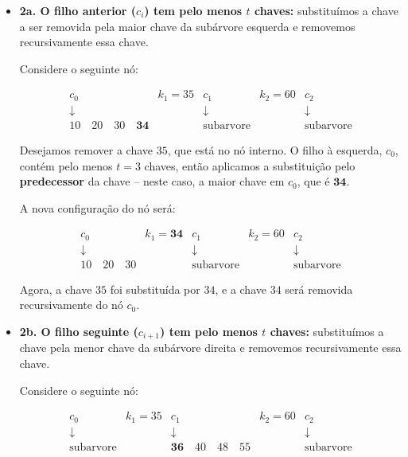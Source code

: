 \begin{itemize}
  \item \textbf{2a. O filho anterior (\( c_i \)) tem pelo menos \( t \) chaves:} substituímos a chave a ser removida pela maior chave da subárvore esquerda e removemos recursivamente essa chave.

Considere o seguinte nó:

\[
\begin{array}{ccccccc}
  \boxed{c_0}      &  k_1 = 35 & \boxed{c_1}       & k_2 = 60 & \boxed{c_2} \\
  \downarrow       &           & \downarrow        &          & \downarrow  \\
  \boxed{10 \quad 20 \quad 30 \quad \textbf{34}} &  & \text{subarvore} &  & \text{subarvore}
\end{array}
\]

Desejamos remover a chave \( 35 \), que está no nó interno. 
O filho à esquerda, \( c_0 \), contém pelo menos \( t = 3 \) chaves, então aplicamos a substituição pelo \textbf{predecessor} da chave -- neste caso, a maior chave em \( c_0 \), que é \( \mathbf{34} \).

A nova configuração do nó será:

\[
\begin{array}{ccccccc}
  \boxed{c_0}      &  k_1 = \mathbf{34} & \boxed{c_1}       & k_2 = 60 & \boxed{c_2} \\
  \downarrow       &           & \downarrow        &          & \downarrow  \\
  \boxed{10 \quad 20 \quad 30} &  & \text{subarvore} &  & \text{subarvore}
\end{array}
\]

Agora, a chave \( 35 \) foi substituída por \( 34 \), e a chave \( 34 \) será removida recursivamente do nó \( c_0 \).

  \item \textbf{2b. O filho seguinte (\( c_{i+1} \)) tem pelo menos \( t \) chaves:} substituímos a chave pela menor chave da subárvore direita e removemos recursivamente essa chave.

Considere o seguinte nó:

\[
\begin{array}{ccccccc}
  \boxed{c_0}      &  k_1 = 35 & \boxed{c_1}        & k_2 = 60 & \boxed{c_2} \\
  \downarrow       &           & \downarrow         &          & \downarrow  \\
  \text{subarvore} &       & \boxed{\mathbf{36} \quad 40 \quad 48 \quad 55} &        & \text{subarvore}
\end{array}
\]


\end{itemize}
